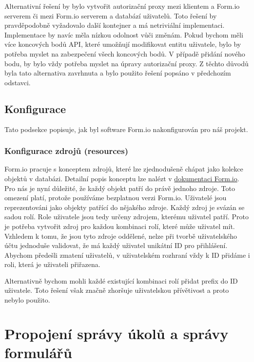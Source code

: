 Alternativní řešení by bylo vytvořit autorizační proxy mezi klientem a Form.io serverem či mezi Form.io serverem a databází uživatelů.
Toto řešení by pravděpodobně vyžadovalo další kontejner a má netriviální implementaci.
Implementace by navíc měla nízkou odolnost vůči změnám.
Pokud bychom měli více koncových bodů API, které umožňují modifikovat entitu uživatele, bylo by potřeba myslet na zabezpečení všech koncových bodů.
V případě přidání nového bodu, by bylo vždy potřeba myslet na úpravy autorizační proxy.
Z těchto důvodů byla tato alternativa zavrhnuta a bylo použito řešení popsáno v předchozím odstavci.

\subsection{Konfigurace}\label{subsec:konfigurace}

Tato podsekce popisuje, jak byl software Form.io nakonfigurován pro náš projekt.

\subsubsection{Konfigurace zdrojů (resources)}\label{subsubsec:konfigurace-resources}

Form.io pracuje s konceptem zdrojů, které lze zjednodušeně chápat jako kolekce objektů v databázi.
Detailní popis konceptu lze nalézt v \href{https://help.form.io/userguide/resources}{dokumentaci Form.io}.
Pro nás je nyní důležité, že každý objekt patří do právě jednoho zdroje.
Toto omezení platí, protože používáme bezplatnou verzi Form.io.
Uživatelé jsou reprezentováni jako objekty patřící do nějakého zdroje.
Každý zdroj je svázán se sadou rolí.
Role uživatele jsou tedy určeny zdrojem, kterému uživatel patří.
Proto je potřeba vytvořit zdroj pro každou kombinaci rolí, které může uživatel mít.
Vzhledem k tomu, že jsou tyto zdroje oddělené, nelze při tvorbě uživatelského účtu jednoduše validovat, že má každý uživatel unikátní ID pro přihlášení.
Abychom předešli zmatení uživatelů, v uživatelském rozhraní vždy k ID přidáme i roli, která je uživateli přiřazena.

Alternativně bychom mohli každé existující kombinaci rolí přidat prefix do ID uživatele.
Toto řešení však značně zhoršuje uživatelskou přívětivost a proto nebylo použito.


\section{Propojení správy úkolů a správy formulářů}\label{sec:propojeni-spravy-ukolu-a-spravy-formularu}

